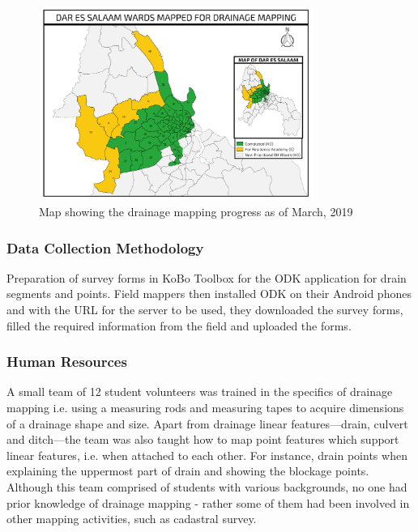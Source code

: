 \documentclass[a4paper,12pt,twoside]{article}
\begin{document}
\begin{figure}[h]
  \color{RHgreen}\caption{Map showing the drainage mapping progress as of March, 2019}
  \centering
  \includegraphics[width=0.8\textwidth]{images/Drain_Mapping.png}
\end{figure}

\subsubsection{Data Collection Methodology}
Preparation of survey forms in KoBo Toolbox for the ODK application for drain segments and points. Field mappers then installed ODK on their Android phones and with the URL for the server to be used, they downloaded the survey forms, filled the required information from the field and uploaded the forms.

\subsubsection{Human Resources}
A small team of 12 student volunteers was trained in the specifics of drainage mapping i.e. using a measuring rods and measuring tapes to acquire dimensions of a drainage shape and size. Apart from drainage linear features---drain, culvert and ditch---the team was also taught how to map point features which support linear features, i.e. when attached to each other. For instance, drain points when explaining the uppermost part of drain and showing the blockage points. Although this team comprised of students with various backgrounds, no one had prior knowledge of drainage mapping - rather some of them had been involved in other mapping activities, such as cadastral survey.
\end{document}
